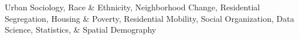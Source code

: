 

\begin{cventries}

  \cventry
    { } %
{ } %
    { } %
    { } %
    {
      \begin{cvitems} %
        Urban Sociology, Race \& Ethnicity, Neighborhood Change, Residential Segregation, Housing \& Poverty, Residential Mobility, Social Organization, Data Science, Statistics, \& Spatial  Demography      
      \end{cvitems}
    }    

\end{cventries}
